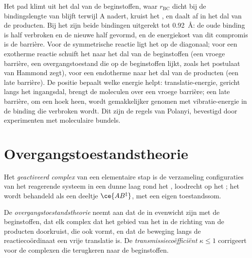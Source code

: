 Het pad klimt uit het dal van de beginstoffen, waar $r_{\mathrm{BC}}$ dicht
bij de bindingslengte van  blijft terwijl A nadert, kruist het
, en daalt af in het dal van de producten. Bij het  zijn
beide bindingen uitgerekt tot \qty{0.92}{\angstrom}: de oude binding is
half verbroken en de nieuwe half gevormd, en de energiekost van dit
compromis is de barrière. Voor de symmetrische reactie ligt het 
op de diagonaal; voor een exotherme reactie schuift het naar het dal van
de beginstoffen (een vroege barrière, een overgangstoestand die op de
beginstoffen lijkt, zoals het postulaat van Hammond zegt), voor een
endotherme naar het dal van de producten (een late barrière).
De positie bepaalt welke energie helpt: translatie-energie, gericht langs
het ingangsdal, brengt de moleculen over een vroege barrière; een late
barrière, om een hoek heen, wordt gemakkelijker genomen met vibratie-energie
in de binding die verbroken wordt. Dit zijn de regels van Polanyi,
bevestigd door experimenten met moleculaire bundels.

\section{Overgangstoestandstheorie}

\begin{definition}\label{def:b3:rate-theories:activated-complex}
Het \emph{geactiveerd complex} van een
elementaire stap is de verzameling configuraties van het reagerende
systeem in een dunne laag rond het , loodrecht op het ; het wordt behandeld als een deeltje $\ce{AB^{\ddagger}}$,
met een eigen toestandssom.
\end{definition}

\begin{definition}\label{def:b3:rate-theories:tst}
De \emph{overgangstoestandstheorie} neemt
aan dat de  in evenwicht zijn met de beginstoffen,
dat elk complex dat het gebied van het  in de richting van de
producten doorkruist, die ook vormt, en dat de beweging langs de
reactiecoördinaat een vrije translatie is. De
\emph{transmissiecoëfficiënt} $\kappa \le 1$ corrigeert voor
de complexen die terugkeren naar de beginstoffen.
\end{definition}


